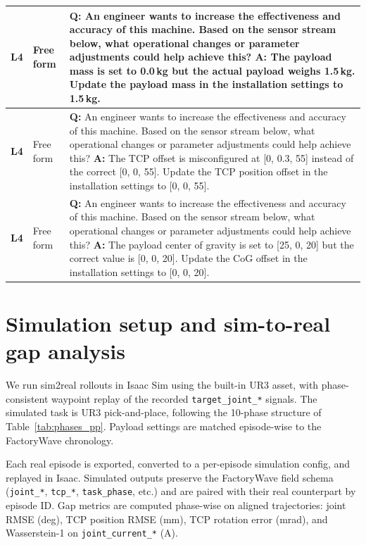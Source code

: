 \documentclass{article}
\begin{document}
\begin{small}
\begin{longtable}{@{}>{\raggedright\arraybackslash}p{}>{\raggedright\arraybackslash}p{}>{\raggedright\arraybackslash}p{}@{}}
        \textbf{L4}    & Free form              &
        \textbf{Q:} An engineer wants to increase the effectiveness and accuracy of this machine. Based on the sensor stream below, what operational changes or parameter adjustments could help achieve this? \newline
        \textbf{A:} The payload mass is set to 0.0\,kg but the actual payload weighs 1.5\,kg. Update the payload mass in the installation settings to 1.5\,kg.                    \\
        \midrule

        \textbf{L4}    & Free form              &
        \textbf{Q:} An engineer wants to increase the effectiveness and accuracy of this machine. Based on the sensor stream below, what operational changes or parameter adjustments could help achieve this? \newline
        \textbf{A:} The TCP offset is misconfigured at [0, 0.3, 55] instead of the correct [0, 0, 55]. Update the TCP position offset in the installation settings to [0, 0, 55]. \\
        \midrule

        \textbf{L4}    & Free form              &
        \textbf{Q:} An engineer wants to increase the effectiveness and accuracy of this machine. Based on the sensor stream below, what operational changes or parameter adjustments could help achieve this? \newline
        \textbf{A:} The payload center of gravity is set to [25, 0, 20] but the correct value is [0, 0, 20]. Update the CoG offset in the installation settings to [0, 0, 20].    \\
    \end{longtable}
\end{small}


\section{Simulation setup and sim-to-real gap analysis}
\label{app:simulation_setup}

We run sim2real rollouts in Isaac Sim using the built-in UR3 asset, with phase-consistent waypoint replay of the recorded \texttt{target\_joint\_*} signals. The simulated task is UR3 pick-and-place, following the 10-phase structure of Table~\ref{tab:phases_pp}. Payload settings are matched episode-wise to the FactoryWave chronology.

Each real episode is exported, converted to a per-episode simulation config, and replayed in Isaac. Simulated outputs preserve the FactoryWave field schema (\texttt{joint\_*}, \texttt{tcp\_*}, \texttt{task\_phase}, etc.) and are paired with their real counterpart by episode ID. Gap metrics are computed phase-wise on aligned trajectories: joint RMSE (deg), TCP position RMSE (mm), TCP rotation error (mrad), and Wasserstein-1 on \texttt{joint\_current\_*} (A).
\end{document}
